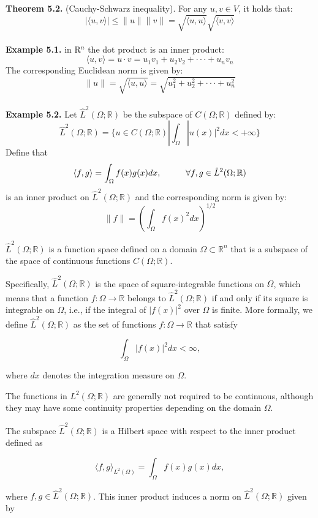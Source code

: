 \documentclass[12pt]{article} %
\begin{document}
\textbf{Theorem 5.2.} (Cauchy-Schwarz inequality). For any $u,v \in V$, it holds that:
$$
|\langle u, v \rangle| \le \|u \| \|v \|=\sqrt{\langle u, u \rangle}\sqrt{\langle v, v \rangle}
$$\\
\textbf{Example 5.1.} in R$^{n}$ the dot product is an inner product:
$$
\langle u, v \rangle = u \cdot v = u_{1}v_{1}+u_{2}v_{2}+\cdot \cdot \cdot+u_{n}v_{n}
$$
The corresponding Euclidean norm is given by:
$$
\| u\| = \sqrt{\langle u, u \rangle}=\sqrt{u_{1}^{2}+u_{2}^{2}+\cdot \cdot \cdot+u_{n}^{2}}
$$\\
\textbf{Example 5.2.} Let $\hat{L}^{2} (\Omega; \mathbb{R})$ be the subspace of $C(\Omega; \mathbb{R})$ defined by:
$$
\hat{L}^{2} (\Omega; \mathbb{R}) = \{ u \in C (\Omega; \mathbb{R}) | \int_{\Omega}|u(x)|^2 dx < + \infty \}
$$Define that
$$
\langle f,g\rangle =\int_{\Omega}f(x)g(x)dx, \hspace{10mm} \forall  f,g \in \hat{L}^{2} (\Omega; \mathbb{R})
$$ is an inner product on $\hat{L}^{2} (\Omega; \mathbb{R})$ and the corresponding norm is given by:
$$
\|f\|=(\int_{\Omega}f(x)^{2}dx)^{1/2}
$$
\par
 $\hat{L}^2(\Omega; \mathbb{R})$ is a function space defined on a domain $\Omega\subset\mathbb{R}^n$ that is a subspace of the space of continuous functions $C(\Omega; \mathbb{R})$.\par
 Specifically, $\hat{L}^2(\Omega; \mathbb{R})$ is the space of square-integrable functions on $\Omega$, which means that a function $f:\Omega\rightarrow \mathbb{R}$ belongs to $\hat{L}^2(\Omega; \mathbb{R})$ if and only if its square is integrable on $\Omega$, i.e., if the integral of $|f(x)|^2$ over $\Omega$ is finite. More formally, we define $\hat{L}^2(\Omega; \mathbb{R})$ as the set of functions $f:\Omega\rightarrow \mathbb{R}$ that satisfy

$$\int_\Omega |f(x)|^2 dx < \infty,$$

where $dx$ denotes the integration measure on $\Omega$.

The functions in ${L}^2(\Omega; \mathbb{R})$ are generally not required to be continuous, although they may have some continuity properties depending on the domain $\Omega$.

The subspace $\hat{L}^2(\Omega; \mathbb{R})$ is a Hilbert space with respect to the inner product defined as

$$\langle f,g \rangle_{L^2(\Omega)} = \int_\Omega f(x)g(x)dx,$$

where $f,g\in \hat{L}^2(\Omega; \mathbb{R})$. This inner product induces a norm on $\hat{L}^2(\Omega; \mathbb{R})$ given by
\end{document}
